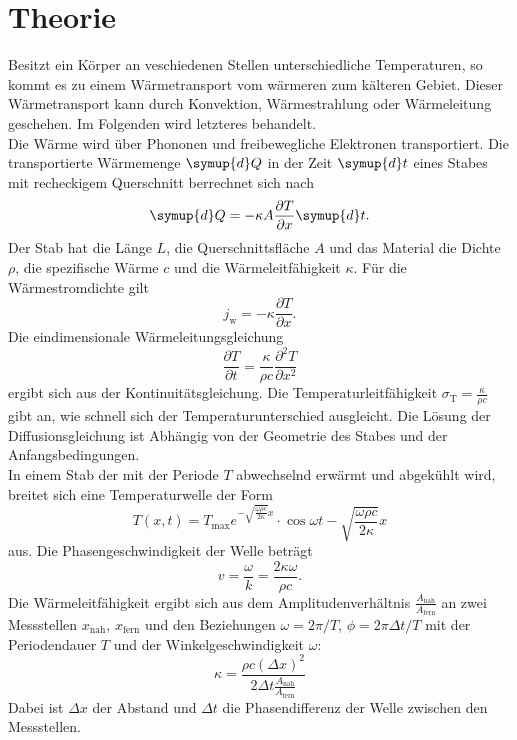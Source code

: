 \section{Theorie}
\label{sec:Theorie}
Besitzt ein Körper an veschiedenen Stellen unterschiedliche Temperaturen, so kommt es zu einem Wärmetransport vom wärmeren zum kälteren Gebiet.
Dieser Wärmetransport kann durch Konvektion, Wärmestrahlung oder Wärmeleitung geschehen.
Im Folgenden wird letzteres behandelt.\\
Die Wärme wird über Phononen und freibewegliche Elektronen transportiert.
Die transportierte Wärmemenge $\symup{d}Q$ in der Zeit $\symup{d}t$ eines Stabes mit recheckigem Querschnitt berrechnet sich nach
\begin{equation}
    \symup{d}Q = -\kappa A \frac{\partial T}{\partial x} \symup{d}t .
\end{equation}
Der Stab hat die Länge $L$, die Querschnittsfläche $A$ und das Material die Dichte $\rho$, die spezifische Wärme $c$ und die Wärmeleitfähigkeit $\kappa$.
Für die Wärmestromdichte gilt 
\begin{equation}
    j_\text{w} = -\kappa \frac{\partial T}{\partial x} .
\end{equation}
Die eindimensionale Wärmeleitungsgleichung
\begin{equation}
    \frac{\partial T}{\partial t} = \frac{\kappa}{\rho c} \frac{\partial^2 T}{\partial x^2}
    \label{eqn:wellengleichung}
\end{equation}
ergibt sich aus der Kontinuitätsgleichung.
Die Temperaturleitfähigkeit $\sigma_\text{T} = \frac{\kappa}{\rho c}$ gibt an, wie schnell sich der Temperaturunterschied ausgleicht.
Die Lösung der Diffusionsgleichung ist Abhängig von der Geometrie des Stabes und der Anfangsbedingungen.
\\
In einem Stab der mit der Periode $T$ abwechselnd erwärmt und abgekühlt wird, breitet sich eine Temperaturwelle der Form
\begin{equation}
    T(x,t) = T_\text{max} e^{-\sqrt{\frac{\omega \rho c}{2 \kappa}}x} \cdot \cos{\omega t - \sqrt{\frac{\omega \rho c}{2 \kappa}}x}
\end{equation}
aus.
Die Phasengeschwindigkeit der Welle beträgt
\begin{equation}
    v = \frac{\omega}{k} = \frac{2 \kappa \omega}{\rho c} .
\end{equation}
Die Wärmeleitfähigkeit ergibt sich aus dem Amplitudenverhältnis $\frac{A_\text{nah}}{A_\text{fern}}$ an zwei Messstellen $x_\text{nah}$, $x_\text{fern}$ und den Beziehungen $\omega = 2\pi / T$, $\phi = 2 \pi \Delta t / T$ mit der Periodendauer $T$ und der Winkelgeschwindigkeit $\omega$:
\begin{equation}
    \kappa = \frac{\rho c (\Delta x)^2}{2 \Delta t \frac{A_\text{nah}}{A_\text{fern}}}
\end{equation}
Dabei ist $\Delta x$ der Abstand und $\Delta t$ die Phasendifferenz der Welle zwischen den Messstellen.